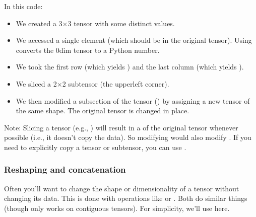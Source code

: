 \documentclass[letterpaper,10pt,english]{jupyterBook}
\begin{document}
\sphinxAtStartPar
In this code:
\begin{itemize}
\item {} 
\sphinxAtStartPar
We created a 3×3 tensor  with some distinct values.

\item {} 
\sphinxAtStartPar
We accessed a single element  (which should be  in the original tensor). Using  converts the 0\sphinxhyphen{}dim tensor to a Python number.

\item {} 
\sphinxAtStartPar
We took the first row  (which yields \sphinxcode{\sphinxupquote{{[}10, 11, 12{]}}}) and the last column  (which yields \sphinxcode{\sphinxupquote{{[}12, 22, 32{]}}}).

\item {} 
\sphinxAtStartPar
We sliced a 2×2 sub\sphinxhyphen{}tensor (the upper\sphinxhyphen{}left corner).

\item {} 
\sphinxAtStartPar
We then modified a sub\sphinxhyphen{}section of the tensor () by assigning a new tensor of the same shape. The original tensor  is changed in place.

\end{itemize}

\sphinxAtStartPar
Note: Slicing a tensor (e.g., ) will result in a  of the original tensor whenever possible (i.e., it doesn’t copy the data). So modifying  would also modify . If you need to explicitly copy a tensor or sub\sphinxhyphen{}tensor, you can use .


\subsubsection{Reshaping and concatenation}
\label{\detokenize{04:reshaping-and-concatenation}}
\sphinxAtStartPar
Often you’ll want to change the shape or dimensionality of a tensor without changing its data. This is done with operations like  or . Both do similar things (though  only works on contiguous tensors). For simplicity, we’ll use  here.
\end{document}
